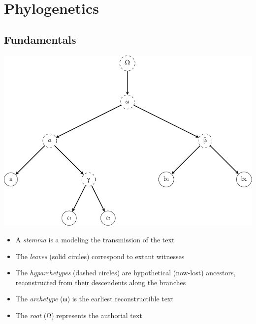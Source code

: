 \documentclass[10pt]{beamer}
\begin{document}
	\section{Phylogenetics}
	\subsection{Fundamentals}
	\begin{frame}
		\begin{center}
			\includegraphics[scale=0.5]{../img/gene-tree-rooted-site-1.pdf}
		\end{center}
		\begin{itemize}
			\item A \emph{stemma} is a  modeling the transmission of the text
			\item The \emph{leaves} (solid circles) correspond to extant witnesses
			\item The \emph{hyparchetypes} (dashed circles) are hypothetical (now-lost) ancestors, reconstructed from their descendents along the branches
			\item The \emph{archetype} (\textgreek{ω}) is the earliest reconstructible text
			\item The \emph{root} (\textgreek{Ω}) represents the authorial text
		\end{itemize}
	\end{frame}
\end{document}
